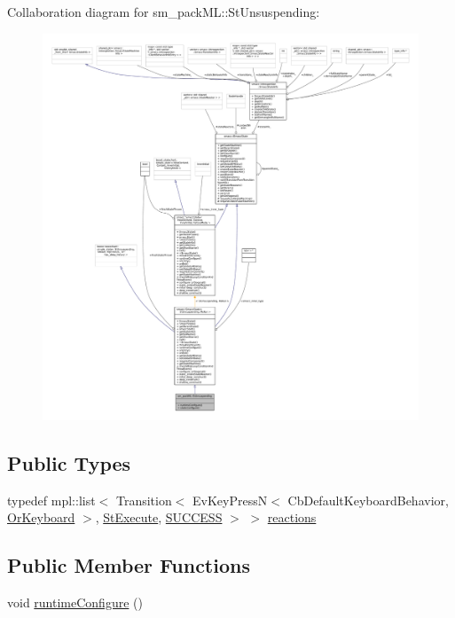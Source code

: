Collaboration diagram for sm\+\_\+pack\+ML\+:\+:St\+Unsuspending\+:
\nopagebreak
\begin{figure}[H]
\begin{center}
\leavevmode
\includegraphics[width=350pt]{structsm__packML_1_1StUnsuspending__coll__graph}
\end{center}
\end{figure}
\subsection*{Public Types}
\begin{DoxyCompactItemize}
\item 
typedef mpl\+::list$<$ Transition$<$ Ev\+Key\+PressN$<$ Cb\+Default\+Keyboard\+Behavior, \hyperlink{classsm__packML_1_1OrKeyboard}{Or\+Keyboard} $>$, \hyperlink{structsm__packML_1_1StExecute}{St\+Execute}, \hyperlink{classSUCCESS}{S\+U\+C\+C\+E\+SS} $>$ $>$ \hyperlink{structsm__packML_1_1StUnsuspending_aee6c7c57b9289d53b71b22234277eed3}{reactions}
\end{DoxyCompactItemize}
\subsection*{Public Member Functions}
\begin{DoxyCompactItemize}
\item 
void \hyperlink{structsm__packML_1_1StUnsuspending_acd61f286c4c4378cc207d7e52bb7e373}{runtime\+Configure} ()
\end{DoxyCompactItemize}
